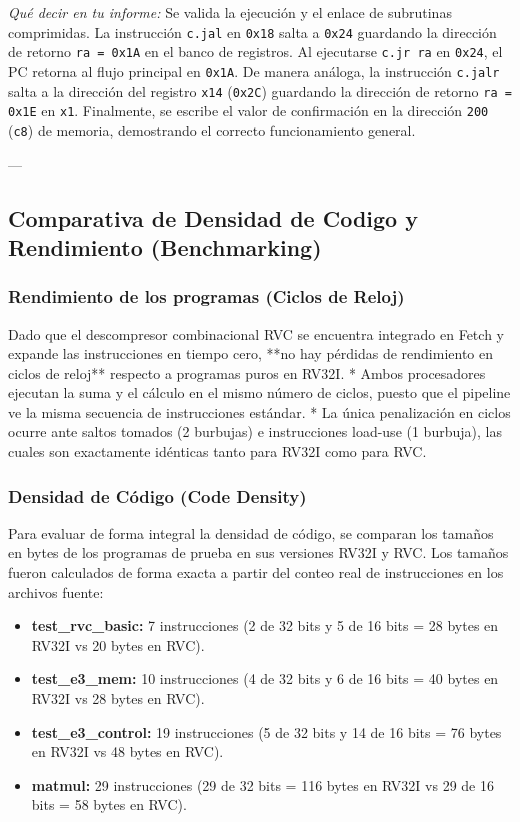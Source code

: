 \documentclass[12pt, a4paper]{article}
\begin{document}
\textit{Qué decir en tu informe:} Se valida la ejecución y el enlace de subrutinas comprimidas. La instrucción \texttt{c.jal} en \texttt{0x18} salta a \texttt{0x24} guardando la dirección de retorno \texttt{ra = 0x1A} en el banco de registros. Al ejecutarse \texttt{c.jr ra} en \texttt{0x24}, el PC retorna al flujo principal en \texttt{0x1A}. De manera análoga, la instrucción \texttt{c.jalr} salta a la dirección del registro \texttt{x14} (\texttt{0x2C}) guardando la dirección de retorno \texttt{ra = 0x1E} en \texttt{x1}. Finalmente, se escribe el valor de confirmación en la dirección \texttt{200} (\texttt{c8}) de memoria, demostrando el correcto funcionamiento general.

---

\subsection{Comparativa de Densidad de Codigo y Rendimiento (Benchmarking)}

\subsubsection{Rendimiento de los programas (Ciclos de Reloj)}
Dado que el descompresor combinacional RVC se encuentra integrado en Fetch y expande las instrucciones en tiempo cero, **no hay pérdidas de rendimiento en ciclos de reloj** respecto a programas puros en RV32I.
*   Ambos procesadores ejecutan la suma y el cálculo en el mismo número de ciclos, puesto que el pipeline ve la misma secuencia de instrucciones estándar.
*   La única penalización en ciclos ocurre ante saltos tomados (2 burbujas) e instrucciones load-use (1 burbuja), las cuales son exactamente idénticas tanto para RV32I como para RVC.

\subsubsection{Densidad de Código (Code Density)}
Para evaluar de forma integral la densidad de código, se comparan los tamaños en bytes de los programas de prueba en sus versiones RV32I y RVC. Los tamaños fueron calculados de forma exacta a partir del conteo real de instrucciones en los archivos fuente:
\begin{itemize}
  \item \textbf{test\_rvc\_basic:} 7 instrucciones (2 de 32 bits y 5 de 16 bits = 28 bytes en RV32I vs 20 bytes en RVC).
  \item \textbf{test\_e3\_mem:} 10 instrucciones (4 de 32 bits y 6 de 16 bits = 40 bytes en RV32I vs 28 bytes en RVC).
  \item \textbf{test\_e3\_control:} 19 instrucciones (5 de 32 bits y 14 de 16 bits = 76 bytes en RV32I vs 48 bytes en RVC).
  \item \textbf{matmul:} 29 instrucciones (29 de 32 bits = 116 bytes en RV32I vs 29 de 16 bits = 58 bytes en RVC).
\end{itemize}
\end{document}
